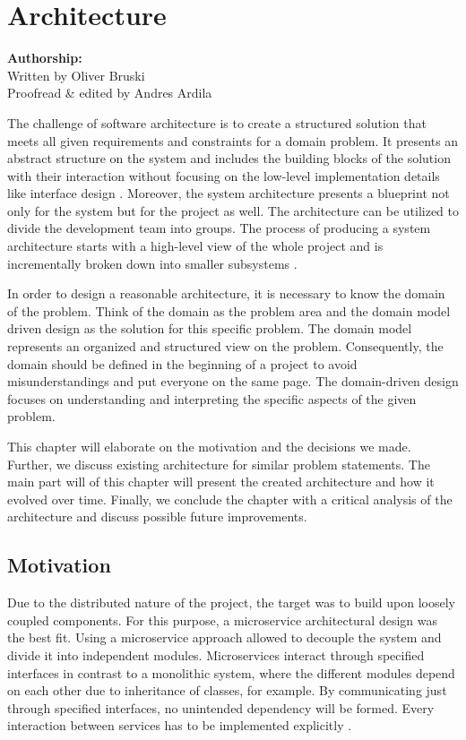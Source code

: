 \section{Architecture}\label{sec:architecture}

\textbf{Authorship:}\\
Written by Oliver Bruski\\
Proofread \& edited by Andres Ardila
\vspace*{12 pt}


The challenge of software architecture is to create a structured
solution that meets all given requirements and constraints for a domain
problem. It presents an abstract structure on the system and includes
the building blocks of the solution with their interaction without
focusing on the low-level implementation details like interface design
\cite{Garlan&Shaw.1994}. Moreover, the system architecture presents a blueprint
not only for the system but for the project as well. The architecture
can be utilized to divide the development team into groups. The process
of producing a system architecture starts with a high-level view of the
whole project and is incrementally broken down into smaller subsystems
\cite{Bass&Clements&Kazmann.2012}.

In order to design a reasonable architecture, it is necessary to know
the domain of the problem. Think of the domain as the problem area and
the domain model driven design as the solution for this specific
problem. The domain model represents an organized and structured view on
the problem. Consequently, the domain should be defined in the beginning
of a project to avoid misunderstandings and put everyone on the same page.
The domain-driven design focuses on understanding and interpreting
the specific aspects of the given problem.

This chapter will elaborate on the motivation and the decisions we made.
Further, we discuss existing architecture for similar problem
statements. The main part will of this chapter will present the created
architecture and how it evolved over time. Finally, we conclude the
chapter with a critical analysis of the architecture and discuss
possible future improvements.

\subsection{Motivation}\label{motivation}

Due to the distributed nature of the project, the target was to build
upon loosely coupled components. For this purpose, a microservice
architectural design was the best fit. Using a microservice approach
allowed to decouple the system and divide it into independent modules.
Microservices interact through specified interfaces in contrast to a
monolithic system, where the different modules depend on each other due to
inheritance of classes, for example. By communicating just through
specified interfaces, no unintended dependency will be formed. Every
interaction between services has to be implemented explicitly \cite{Wolff.2016}.

